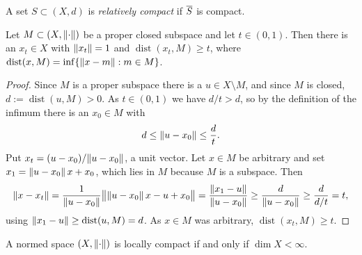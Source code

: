 \begin{definition}\label{def:rel-compact}
A set $S \subset (X,d)$ is \emph{relatively compact} if $\overline{S}$ is compact.
\end{definition}

\begin{lemma}[Riesz]\label{lem:riesz}
Let $M \subset (X, \lVert\cdot\rVert)$ be a proper closed subspace and let
$t \in (0,1)$. Then there is an $x_t \in X$ with $\lVert x_t\rVert = 1$ and
$\operatorname{dist}(x_t, M) \ge t$, where
$\operatorname{dist}(x, M) = \inf\{\lVert x - m\rVert : m \in M\}$.
\end{lemma}

\begin{proof}
Since $M$ is a proper subspace there is a $u \in X \setminus M$, and since $M$
is closed, $d := \operatorname{dist}(u, M) > 0$. As $t \in (0,1)$ we have
$d/t > d$, so by the definition of the infimum there is an $x_0 \in M$ with
\[
  d \le \lVert u - x_0\rVert \le \frac{d}{t} .
\]
Put $x_t = (u - x_0)/\lVert u - x_0\rVert$, a unit vector. Let $x \in M$ be
arbitrary and set $x_1 = \lVert u - x_0\rVert\,x + x_0$, which lies in $M$ because
$M$ is a subspace. Then
\[
  \lVert x - x_t\rVert
  = \frac{1}{\lVert u-x_0\rVert}\bigl\lVert \lVert u-x_0\rVert\,x - u + x_0 \bigr\rVert
  = \frac{\lVert x_1 - u\rVert}{\lVert u - x_0\rVert}
  \ge \frac{d}{\lVert u-x_0\rVert}
  \ge \frac{d}{d/t} = t ,
\]
using $\lVert x_1 - u\rVert \ge \operatorname{dist}(u,M) = d$. As $x \in M$ was
arbitrary, $\operatorname{dist}(x_t, M) \ge t$.
\end{proof}

\begin{theorem}\label{thm:locally-compact}
A normed space $(X, \lVert\cdot\rVert)$ is locally compact if and only if
$\dim X < \infty$.
\end{theorem}

